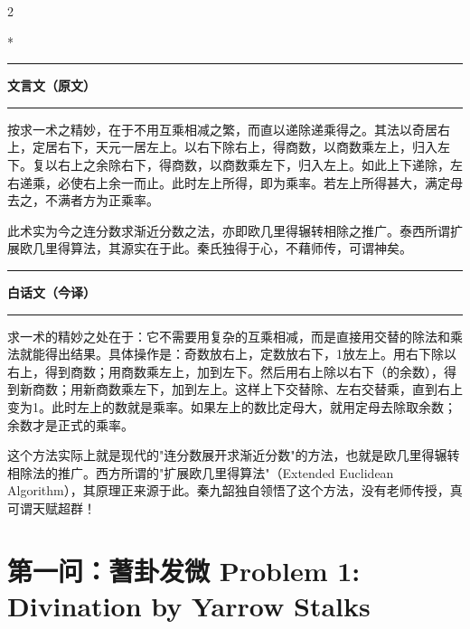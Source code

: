 \documentclass[11pt,a4paper]{article}
\newcommand{\zhtext}[1]{{\chinese #1}}
\newcommand{\leftcolheader}{%
  \noindent\textcolor{leftheader}{\rule{\columnwidth}{1.5pt}}\par
  \vspace{2pt}
  \noindent\textbf{\color{leftheader}\chinese 文言文（原文）}\par
  \vspace{2pt}
  \noindent\textcolor{leftheader}{\rule{\columnwidth}{0.6pt}}\par
  \vspace{4pt}
}
\newcommand{\rightcolheader}{%
  \noindent\textcolor{rightheader}{\rule{\columnwidth}{1.5pt}}\par
  \vspace{2pt}
  \noindent\textbf{\color{rightheader}\chinese 白话文（今译）}\par
  \vspace{2pt}
  \noindent\textcolor{rightheader}{\rule{\columnwidth}{0.6pt}}\par
  \vspace{4pt}
}
\begin{document}
\begin{paracol}{2}

\switchcolumn[0]*\leftcolheader

\small
按求一术之精妙，在于不用互乘相减之繁，而直以递除递乘得之。其法以奇居右上，定居右下，天元一居左上。以右下除右上，得商数，以商数乘左上，归入左下。复以右上之余除右下，得商数，以商数乘左下，归入左上。如此上下递除，左右递乘，必使右上余一而止。此时左上所得，即为乘率。若左上所得甚大，满定母去之，不满者方为正乘率。

此术实为今之连分数求渐近分数之法，亦即欧几里得辗转相除之推广。泰西所谓扩展欧几里得算法，其源实在于此。秦氏独得于心，不藉师传，可谓神矣。

\switchcolumn\rightcolheader

\small\color{prefacecolor}
求一术的精妙之处在于：它不需要用复杂的互乘相减，而是直接用交替的除法和乘法就能得出结果。具体操作是：奇数放右上，定数放右下，1放左上。用右下除以右上，得到商数；用商数乘左上，加到左下。然后用右上除以右下（的余数），得到新商数；用新商数乘左下，加到左上。这样上下交替除、左右交替乘，直到右上变为1。此时左上的数就是乘率。如果左上的数比定母大，就用定母去除取余数；余数才是正式的乘率。

这个方法实际上就是现代的"连分数展开求渐近分数"的方法，也就是欧几里得辗转相除法的推广。西方所谓的"扩展欧几里得算法"（Extended Euclidean Algorithm），其原理正来源于此。秦九韶独自领悟了这个方法，没有老师传授，真可谓天赋超群！

\end{paracol}

\newpage

\section{\zhtext{第一问：蓍卦发微} Problem 1: Divination by Yarrow Stalks}
\end{document}
